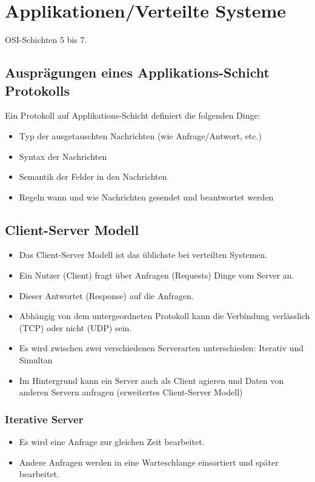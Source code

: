 \chapter{Applikationen/Verteilte Systeme}
	OSI-Schichten 5 bis 7.

	\section{Ausprägungen eines Applikations-Schicht Protokolls}
		Ein Protokoll auf Applikations-Schicht definiert die folgenden Dinge:
		\begin{itemize}
			\item Typ der ausgetauschten Nachrichten (wie Anfrage/Antwort, etc.)
			\item Syntax der Nachrichten
			\item Semantik der Felder in den Nachrichten
			\item Regeln wann und wie Nachrichten gesendet und beantwortet werden
		\end{itemize}

	\section{Client-Server Modell} %
		\begin{itemize}
			\item Das Client-Server Modell ist das üblichste bei verteilten Systemen.
			\item Ein Nutzer (Client) fragt über Anfragen (Requests) Dinge vom Server an.
			\item Dieser Antwortet (Response) auf die Anfragen.
			\item Abhängig von dem untergeordneten Protokoll kann die Verbindung verlässlich (TCP) oder nicht (UDP) sein.
			\item Es wird zwischen zwei verschiedenen Serverarten unterschieden: Iterativ und Simultan
			\item Im Hintergrund kann ein Server auch als Client agieren und Daten von anderen Servern anfragen (erweitertes Client-Server Modell)
		\end{itemize}

		\subsection{Iterative Server}
			\begin{itemize}
				\item Es wird eine Anfrage zur gleichen Zeit bearbeitet.
				\item Andere Anfragen werden in eine Warteschlange einsortiert und später bearbeitet.
			\end{itemize}

